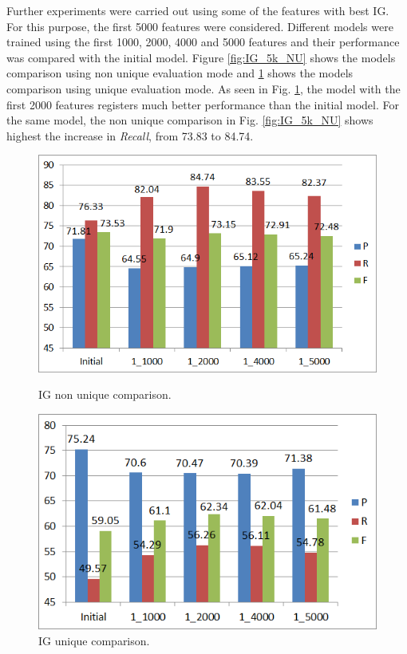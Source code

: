 Further experiments were carried out using some of the features with best IG. For this purpose, the first 5000 features were considered. Different models were trained using the first 1000, 2000, 4000 and 5000 features and their performance was compared with the initial model. Figure \ref{fig:IG_5k_NU} shows the models comparison using non unique evaluation mode and \ref{fig:IG_5k_U} shows the models comparison using unique evaluation mode. As seen in Fig. \ref{fig:IG_5k_U}, the model with the first 2000 features registers much better performance than the initial model. For the same model, the non unique comparison in Fig. \ref{fig:IG_5k_NU} shows highest the increase in \textit{Recall}, from 73.83 to 84.74.

\begin{figure}
\centering
\begin{minipage}{.5\textwidth}
  \centering
  \includegraphics[width=.95\textwidth]{figures/IGFirst5k_NU.png}
  \caption{IG non unique comparison.}
  \label{fig:IG_5k_NU}
\end{minipage}%
\begin{minipage}{.5\textwidth}
  \centering
  \includegraphics[width=.95\textwidth]{figures/IGFirst5k_U.png}
  \caption{IG unique comparison.}
  \label{fig:IG_5k_U}
\end{minipage}
\end{figure}


